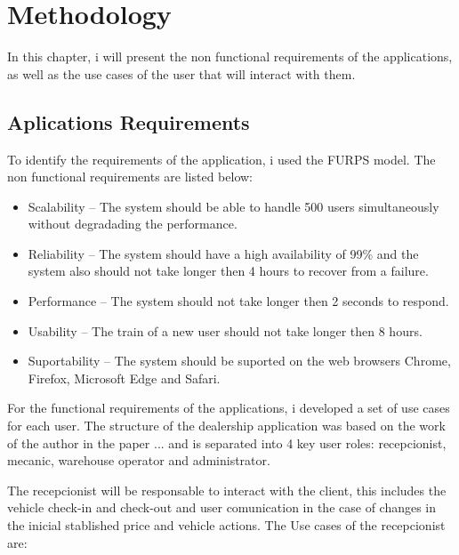 \chapter{Methodology}%
\label{chapter:methodology}

\begin{introduction}
In this chapter, i will present the non functional requirements of the applications, as well as the use cases of the user that will interact with them. 
\end{introduction} 




\section{Aplications Requirements} 


To identify the requirements of the application, i used the FURPS model. 
The non functional requirements are listed below:

\begin{itemize}
  \item Scalability – The system should be able to handle 500 users simultaneously without degradading the performance.
  \item Reliability – The system should have a high availability of 99\% and the system also should not take longer then 4 hours to recover from a failure.
  \item Performance – The system should not take longer then 2 seconds to respond.
  \item Usability – The train of a new user should not take longer then 8 hours.
  \item Suportability – The system should be suported on the web browsers Chrome, Firefox, Microsoft Edge and Safari.
\end{itemize}

For the functional requirements of the applications, i developed a set of use cases for each user.
The structure of the dealership application was based on the work of the author in the paper ... \cite{Setting_the_after_sale_process} and is separated into 4 key user roles: recepcionist, mecanic, warehouse operator and administrator.

The recepcionist will be responsable to interact with the client, this includes the vehicle check-in and check-out and user comunication in the case of changes in the inicial stablished price and vehicle actions. 
The Use cases of the recepcionist are:

